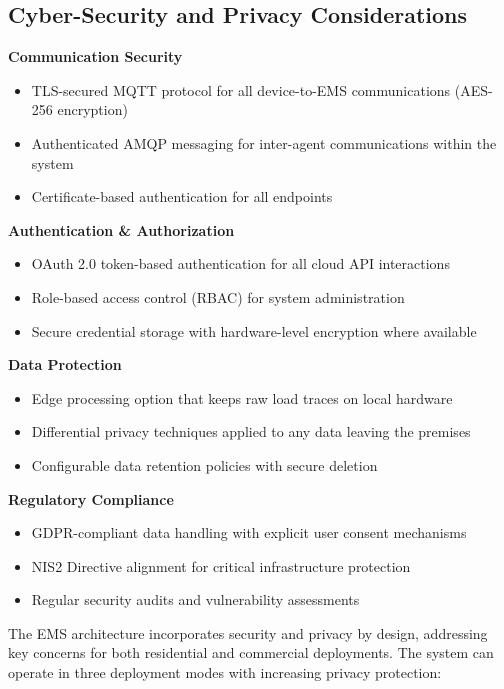 \documentclass[12pt,a4paper]{article}
\begin{document}
\subsection{Cyber-Security and Privacy Considerations}

\begin{tcolorbox}[colback=gray!5!white,colframe=gray!75!black,title=Cyber-Security \& Privacy Framework]
\textbf{Communication Security}
\begin{itemize}
    \item TLS-secured MQTT protocol for all device-to-EMS communications (AES-256 encryption)
    \item Authenticated AMQP messaging for inter-agent communications within the system
    \item Certificate-based authentication for all endpoints
\end{itemize}

\textbf{Authentication \& Authorization}
\begin{itemize}
    \item OAuth 2.0 token-based authentication for all cloud API interactions
    \item Role-based access control (RBAC) for system administration
    \item Secure credential storage with hardware-level encryption where available
\end{itemize}

\textbf{Data Protection}
\begin{itemize}
    \item Edge processing option that keeps raw load traces on local hardware
    \item Differential privacy techniques applied to any data leaving the premises
    \item Configurable data retention policies with secure deletion
\end{itemize}

\textbf{Regulatory Compliance}
\begin{itemize}
    \item GDPR-compliant data handling with explicit user consent mechanisms
    \item NIS2 Directive alignment for critical infrastructure protection
    \item Regular security audits and vulnerability assessments
\end{itemize}
\end{tcolorbox}

The EMS architecture incorporates security and privacy by design, addressing key concerns for both residential and commercial deployments. The system can operate in three deployment modes with increasing privacy protection:
\end{document}
